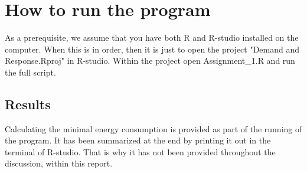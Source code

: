 \documentclass[
11pt, %
english, %
singlespacing, %
parskip, %
headsepline, %
]{report} %
\begin{document}
    \section{How to run the program}
        As a prerequisite, we assume that you have both R and R-studio installed on the computer. When this is in order, then it is just to open the project "Demand and Response.Rproj" in R-studio. Within the project open Assignment\_1.R and run the full script.

    \subsection{Results}
        Calculating the minimal energy consumption is provided as part of the running of the program. It has been summarized at the end by printing it out in the terminal of R-studio. That is why it has not been provided throughout the discussion, within this report.

    \printbibliography[heading=bibintoc]
\end{document}
